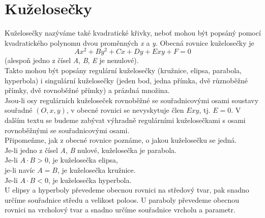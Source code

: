 \chapter{Kuželosečky}
Kuželosečky nazýváme také kvadratické křivky, neboť mohou být popsáný pomocí kvadratického polynomu dvou proměnných
\textit{x} a \textit{y}. Obecná rovnice kuželosečky je
$$Ax^2+By^2+Cx+Dy+Exy+F=0$$
(alespoň jedno z čísel
\textit{A}, \textit{B}, \textit{E} je nenulové). \\
Takto mohou být popsány regulární kuželosečky (kružnice, elipsa,
parabola, hyperbola) i singulární kuželosečky (jeden bod, jedna přímka, dvě různoběžné přímky, dvě rovnoběžné přímky) a prázdná množina. \\[5pt]
Jsou-li osy regulárních kuželoseček rovnoběžné se souřadnicovými osami soustavy souřadné $(O, x, y)$, v obecné rovnici
se nevyskytuje člen $Exy$, tj. $E=0$. V dalším textu se budeme zabývat výhradně regulárními kuželosečkami s osami rovnoběžnými
se souřadnicovými osami. \\
Připomeňme, jak z obecné rovnice poznáme, o jakou kuželosečku se jedná. \\
Je-li jedno z čísel \textit{A}, \textit{B} nulové, kuželosečka je parabola. \\
Je-li $A \cdot B > 0$, je kuželosečka elipsa, \\
je-li navíc $A=B$, je kuželosečka kružnice. \\
Je-li $A \cdot B < 0$, je kuželosečka hyperbola. \\[10pt]
U elipsy a hyperboly převedeme obecnou rovnici na středový tvar, pak snadno určíme souřadnice středu a velikost poloos.
U paraboly převedeme obecnou rovnici na vrcholový tvar a snadno určíme souřadnice vrcholu a parametr. \newpage
